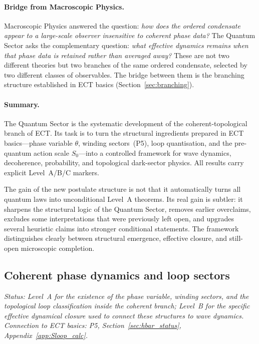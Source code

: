 \paragraph{Bridge from Macroscopic Physics.}
Macroscopic Physics answered the question:
\emph{how does the ordered condensate appear to a large-scale
observer insensitive to coherent phase data?}
The Quantum Sector asks the complementary question:
\emph{what effective dynamics remains when that phase data is
retained rather than averaged away?}
These are not two different theories but two branches of the
same ordered condensate, selected by two different classes of
observables.
The bridge between them is the branching structure established
in ECT basics (Section~\ref{sec:branching}).

\paragraph{Summary.}
The Quantum Sector is the systematic development of the
coherent-topological branch of ECT.
Its task is to turn the structural ingredients prepared in
ECT basics---phase variable $\theta$, winding sectors~(P5),
loop quantisation, and the pre-quantum action scale $S_0$---into
a controlled framework for wave dynamics, decoherence,
probability, and topological dark-sector physics.
All results carry explicit Level~A/B/C markers.

The gain of the new postulate structure is not that it automatically
turns all quantum laws into unconditional Level~A theorems.
Its real gain is subtler: it sharpens the structural logic of the
Quantum Sector, removes earlier overclaims, excludes some
interpretations that were previously left open, and upgrades several
heuristic claims into stronger conditional statements.
The framework distinguishes clearly between structural emergence,
effective closure, and still-open microscopic completion.

\subsection{Coherent phase dynamics and loop sectors}
\label{sec:qs_phase_dynamics}

\textit{Status: Level~A for the existence of the phase variable,
winding sectors, and the topological loop classification inside the
coherent branch; Level~B for the specific effective dynamical closure
used to connect these structures to wave dynamics.
Connection to ECT basics: P5, Section~\ref{sec:hbar_status},
Appendix~\ref{app:Sloop_calc}.}

